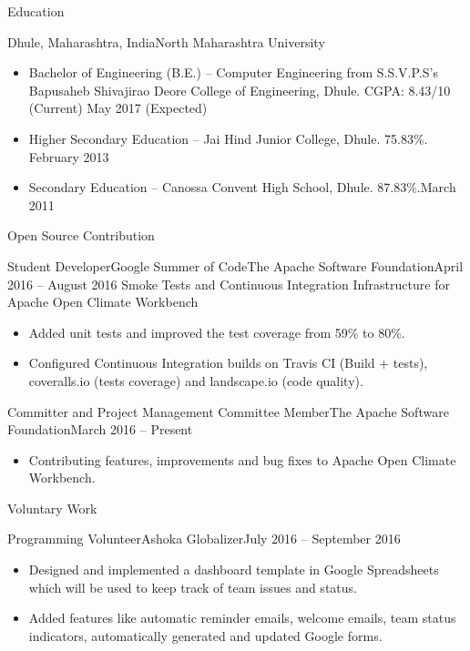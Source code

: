 \documentclass[]{mcdowellcv}
\begin{document}
	\makeheader

	\begin{cvsection}{Education}
		\begin{cvsubsection}{Dhule, Maharashtra, India}{North Maharashtra University}{}
			\begin{itemize}
				\item Bachelor of Engineering (B.E.) -- Computer Engineering from S.S.V.P.S's Bapusaheb Shivajirao Deore College of Engineering, Dhule. CGPA: 8.43/10 (Current) \hfill May 2017 (Expected)
				\item Higher Secondary Education -- Jai Hind Junior College, Dhule. 75.83\%. \hfill February 2013
				\item Secondary Education -- Canossa Convent High School, Dhule. 87.83\%.\hfill March 2011
			\end{itemize}
		\end{cvsubsection}
	\end{cvsection}

	\begin{cvsection}{Open Source Contribution}
		\begin{cvsubsection}[2]{Student Developer\linebreak Google Summer of Code}{The Apache Software Foundation}{April 2016 -- August 2016}
			Smoke Tests and Continuous Integration Infrastructure for Apache Open Climate Workbench
			\begin{itemize}
				\item Added unit tests and improved the test coverage from 59\% to 80\%.
				\item Configured Continuous Integration builds on Travis CI (Build + tests), coveralls.io (tests coverage) and landscape.io (code quality).
			\end{itemize}
		\end{cvsubsection}
		
		\begin{cvsubsection}[2]{Committer and Project Management Committee Member}{The Apache Software Foundation}{March 2016 -- Present}
			\begin{itemize}
				\item Contributing features, improvements and bug fixes to Apache Open Climate Workbench.
			\end{itemize}
		\end{cvsubsection}
	\end{cvsection}
	\begin{cvsection}{Voluntary Work}
		\begin{cvsubsection}{Programming Volunteer}{Ashoka Globalizer}{July 2016 -- September 2016}
			\begin{itemize}
				\item Designed and implemented a dashboard template in Google Spreadsheets which will be used to keep track of team issues and status.
				\item Added features like automatic reminder emails, welcome emails, team status indicators, automatically generated and updated Google forms.
			\end{itemize}
		\end{cvsubsection}
	\end{cvsection}
	
\end{document}
